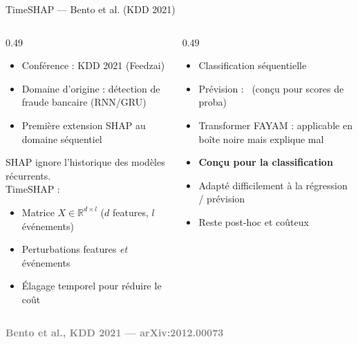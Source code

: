 \documentclass[10pt]{beamer}
\newcommand{\source}[1]{\vspace{4pt}\hfill{\textcolor{gray}{\textbf{\tiny #1}}}}
\begin{document}
\begin{frame}{TimeSHAP — Bento et al. (KDD 2021)}
  \begin{columns}
    \begin{column}{0.49\textwidth}
      \begin{ctxbox}
        \begin{itemize}
          \item Conférence : KDD 2021 (Feedzai)
          \item Domaine d'origine : détection de fraude bancaire (RNN/GRU)
          \item Première extension SHAP au domaine séquentiel
        \end{itemize}
      \end{ctxbox}
      \begin{probbox}
        SHAP ignore l'historique des modèles récurrents.\\
        TimeSHAP :
        \begin{itemize}
          \item Matrice $X \in \mathbb{R}^{d\times l}$ ($d$ features, $l$ événements)
          \item Perturbations features \emph{et} événements
          \item Élagage temporel pour réduire le coût
        \end{itemize}
      \end{probbox}
    \end{column}
    \begin{column}{0.49\textwidth}
      \begin{transposbox}
        \begin{itemize}
          \item Classification séquentielle \checkmark
          \item Prévision : \texttimes\ (conçu pour scores de proba)
          \item Transformer FAYAM : applicable en boîte noire mais explique mal
        \end{itemize}
      \end{transposbox}
      \begin{limitbox}
        \begin{itemize}
          \item \textbf{Conçu pour la classification}
          \item Adapté difficilement à la régression / prévision
          \item Reste post-hoc et coûteux
        \end{itemize}
      \end{limitbox}
    \end{column}
  \end{columns}
  \source{Bento et al., KDD 2021 --- arXiv:2012.00073}
\end{frame}
\end{document}
